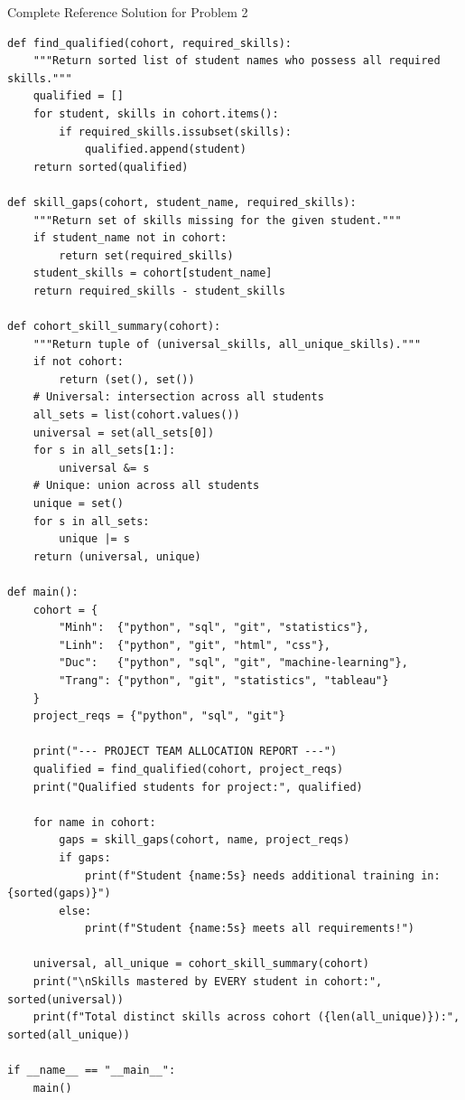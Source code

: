 \documentclass[11pt,a4paper]{article}
\begin{document}
\begin{solbox}{Complete Reference Solution for Problem 2}
\begin{lstlisting}
def find_qualified(cohort, required_skills):
    """Return sorted list of student names who possess all required skills."""
    qualified = []
    for student, skills in cohort.items():
        if required_skills.issubset(skills):
            qualified.append(student)
    return sorted(qualified)

def skill_gaps(cohort, student_name, required_skills):
    """Return set of skills missing for the given student."""
    if student_name not in cohort:
        return set(required_skills)
    student_skills = cohort[student_name]
    return required_skills - student_skills

def cohort_skill_summary(cohort):
    """Return tuple of (universal_skills, all_unique_skills)."""
    if not cohort:
        return (set(), set())
    # Universal: intersection across all students
    all_sets = list(cohort.values())
    universal = set(all_sets[0])
    for s in all_sets[1:]:
        universal &= s
    # Unique: union across all students
    unique = set()
    for s in all_sets:
        unique |= s
    return (universal, unique)

def main():
    cohort = {
        "Minh":  {"python", "sql", "git", "statistics"},
        "Linh":  {"python", "git", "html", "css"},
        "Duc":   {"python", "sql", "git", "machine-learning"},
        "Trang": {"python", "git", "statistics", "tableau"}
    }
    project_reqs = {"python", "sql", "git"}
    
    print("--- PROJECT TEAM ALLOCATION REPORT ---")
    qualified = find_qualified(cohort, project_reqs)
    print("Qualified students for project:", qualified)
    
    for name in cohort:
        gaps = skill_gaps(cohort, name, project_reqs)
        if gaps:
            print(f"Student {name:5s} needs additional training in: {sorted(gaps)}")
        else:
            print(f"Student {name:5s} meets all requirements!")
            
    universal, all_unique = cohort_skill_summary(cohort)
    print("\nSkills mastered by EVERY student in cohort:", sorted(universal))
    print(f"Total distinct skills across cohort ({len(all_unique)}):", sorted(all_unique))

if __name__ == "__main__":
    main()
\end{lstlisting}
\end{solbox}
\end{document}
